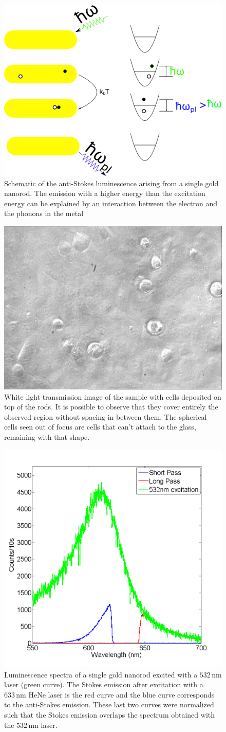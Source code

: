 \documentclass[journal=nalefd,manuscript=letter]{achemso}
\newcommand{\nm}{\ensuremath{\,\textrm{nm}}}
\begin{document}
\begin{figure}[p]
\centering
	\includegraphics[width=0.4\linewidth]{luminescence_all_AS.png}
	\caption{Schematic of the anti-Stokes luminescence arising from a single gold
	nanorod. The emission with a higher energy than the excitation energy can be
	explained by an interaction between the electron and the phonons in the metal}
	\label{fig:anti-Stokes-process}
\end{figure}

\begin{figure}[p]
\centering
	\includegraphics[width=0.4\linewidth]{U2OS_12.jpg}
	\caption{White light transmission image of the sample with cells deposited on
	top of the rods. It is possible to observe that they cover entirely the
	observed region without spacing in between them. The spherical cells seen out
	of focus are cells that can't attach to the glass, remaining with that shape.}
	\label{fig:white-light}
\end{figure}

\begin{figure}[p]
\centering
	\includegraphics[width=0.4\linewidth]{3_Curves.png}
	\caption{Luminescence spectra of a single gold nanorod excited with a $532\nm$
	laser (green curve). The Stokes emission after excitation with a $633\nm$
	HeNe laser is the red curve and the blue curve corresponds to the anti-Stokes
	emission. These last two curves were normalized such that the Stokes emission
	overlaps the spectrum obtained with the $532\nm$ laser.}
	\label{fig:spectra_rod}
\end{figure}
\end{document}
